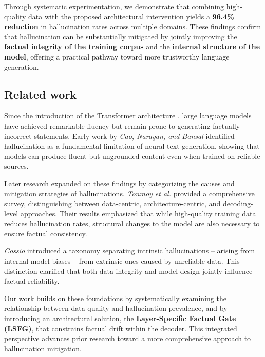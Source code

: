 Through systematic experimentation, we demonstrate that combining high-quality data with the proposed architectural intervention yields a \textbf{96.4\% reduction} in hallucination rates across multiple domains. These findings confirm that hallucination can be substantially mitigated by jointly improving the \textbf{factual integrity of the training corpus} and the \textbf{internal structure of the model}, offering a practical pathway toward more trustworthy language generation.

\subsection{Related work}

Since the introduction of the Transformer architecture \cite{vaswani2017attention}, large language models have achieved remarkable fluency but remain prone to generating factually incorrect statements. Early work by \textit{Cao, Narayan, and Bansal} \cite{cao2021hallucination} identified hallucination as a fundamental limitation of neural text generation, showing that models can produce fluent but ungrounded content even when trained on reliable sources.

Later research expanded on these findings by categorizing the causes and mitigation strategies of hallucinations. \textit{Tonmoy et al.} \cite{islam2024comprehensive} provided a comprehensive survey, distinguishing between data-centric, architecture-centric, and decoding-level approaches. Their results emphasized that while high-quality training data reduces hallucination rates, structural changes to the model are also necessary to ensure factual consistency.

\textit{Cossio} \cite{cossio2025comprehensive} introduced a taxonomy separating intrinsic hallucinations -- arising from internal model biases -- from extrinsic ones caused by unreliable data. This distinction clarified that both data integrity and model design jointly influence factual reliability.

Our work builds on these foundations by systematically examining the relationship between data quality and hallucination prevalence, and by introducing an architectural solution, the \textbf{Layer-Specific Factual Gate (LSFG)}, that constrains factual drift within the decoder. This integrated perspective advances prior research toward a more comprehensive approach to hallucination mitigation.
